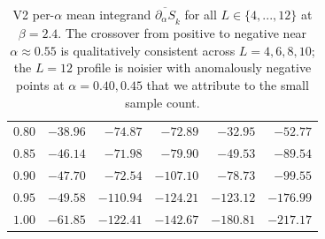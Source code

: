\documentclass[11pt,a4paper]{article}
\theoremstyle{definition}
\begin{document}
\begin{table}[p]
\begin{tabular}{rrrrrr}
$0.80$ & $-38.96$ & $-74.87$ & $-72.89$ & $-32.95$ & $-52.77$ \\
$0.85$ & $-46.14$ & $-71.98$ & $-79.90$ & $-49.53$ & $-89.54$ \\
$0.90$ & $-47.70$ & $-72.54$ & $-107.10$ & $-78.73$ & $-99.55$ \\
$0.95$ & $-49.58$ & $-110.94$ & $-124.21$ & $-123.12$ & $-176.99$ \\
$1.00$ & $-61.85$ & $-122.41$ & $-142.67$ & $-180.81$ & $-217.17$ \\
\bottomrule
\end{tabular}
\caption{V2 per-$\alpha$ mean integrand
$\overline{\partial_\alpha S}_k$ for all $L \in \{4,...,12\}$ at
$\beta = 2.4$. The crossover from positive to negative near
$\alpha \approx 0.55$ is qualitatively consistent across $L =
4,6,8,10$; the $L = 12$ profile is noisier with anomalously negative
points at $\alpha = 0.40, 0.45$ that we attribute to the small
sample count.}
\label{tab:v2-per-alpha}
\end{table}
\end{document}
